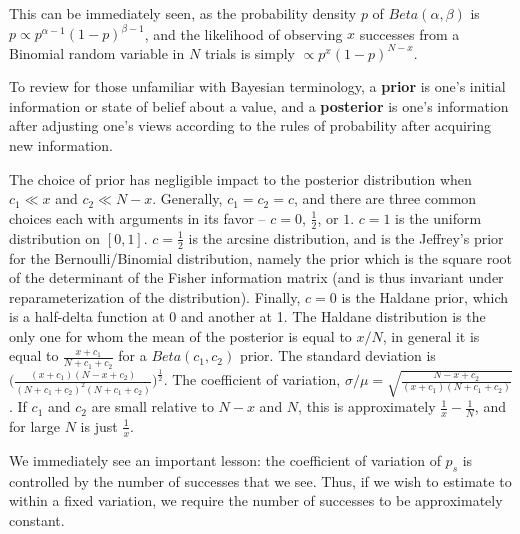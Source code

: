 This can be immediately seen, as the probability density $p$ of $Beta(\alpha,\beta)$ is $p\propto p^{\alpha-1} (1-p)^{\beta-1}$, and the likelihood of observing $x$ successes from a Binomial random variable in $N$ trials is simply $\propto p^{x}(1-p)^{N-x}$.

To review for those unfamiliar with Bayesian terminology, a \textbf{prior} is one's initial information or state of belief about a value, and a \textbf{posterior} is one's information after adjusting one's views according to the rules of probability after acquiring new information.

The choice of prior has negligible impact to the posterior distribution when $c_1 \ll x$ and $c_2 \ll N-x$. Generally, $c_1=c_2=c$, and there are three common choices each with arguments in its favor -- $c = 0$, $\frac12$, or $1$. $c=1$ is the uniform distribution on $[0,1]$. $c=\frac12$ is the arcsine distribution, and is the Jeffrey's prior for the Bernoulli/Binomial distribution, namely the prior which is the square root of the determinant of the Fisher information matrix (and is thus invariant under reparameterization of the distribution). Finally, $c=0$ is the Haldane prior, which is a half-delta function at 0 and another at 1. The Haldane distribution is the only one for whom the mean of the posterior is equal to $x/N$, in general it is equal to $\frac{x+c_1}{N+c_1+c_2}$ for a $Beta(c_1,c_2)$ prior. The standard deviation is $\big(\frac{(x+c_1)(N-x+c_2)}{(N+c_1+c_2)^2(N+c_1+c_2)}\big)^\frac12$. The coefficient of variation, $\sigma/\mu=\sqrt{\frac{N-x+c_2}{(x+c_1)(N+c_1+c_2)}}$. If $c_1$ and $c_2$ are small relative to $N-x$ and $N$, this is approximately $\frac1x-\frac1N$, and for large $N$ is just $\frac1x$.

We immediately see an important lesson: the coefficient of variation of $p_s$ is controlled by the number of successes that we see. Thus, if we wish to estimate to within a fixed variation, we require the number of successes to be approximately constant.

